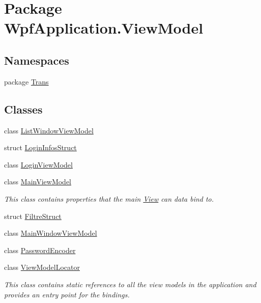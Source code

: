 \hypertarget{namespace_wpf_application_1_1_view_model}{\section{Package Wpf\-Application.\-View\-Model}
\label{namespace_wpf_application_1_1_view_model}
}
\subsection*{Namespaces}
\begin{DoxyCompactItemize}
\item 
package \hyperlink{namespace_wpf_application_1_1_view_model_1_1_trans}{Trans}
\end{DoxyCompactItemize}
\subsection*{Classes}
\begin{DoxyCompactItemize}
\item 
class \hyperlink{class_wpf_application_1_1_view_model_1_1_list_window_view_model}{List\-Window\-View\-Model}
\item 
struct \hyperlink{struct_wpf_application_1_1_view_model_1_1_login_infos_struct}{Login\-Infos\-Struct}
\item 
class \hyperlink{class_wpf_application_1_1_view_model_1_1_login_view_model}{Login\-View\-Model}
\item 
class \hyperlink{class_wpf_application_1_1_view_model_1_1_main_view_model}{Main\-View\-Model}
\begin{DoxyCompactList}\small\item\em This class contains properties that the main \hyperlink{namespace_wpf_application_1_1_view}{View} can data bind to. \end{DoxyCompactList}\item 
struct \hyperlink{struct_wpf_application_1_1_view_model_1_1_filtre_struct}{Filtre\-Struct}
\item 
class \hyperlink{class_wpf_application_1_1_view_model_1_1_main_window_view_model}{Main\-Window\-View\-Model}
\item 
class \hyperlink{class_wpf_application_1_1_view_model_1_1_password_encoder}{Password\-Encoder}
\item 
class \hyperlink{class_wpf_application_1_1_view_model_1_1_view_model_locator}{View\-Model\-Locator}
\begin{DoxyCompactList}\small\item\em This class contains static references to all the view models in the application and provides an entry point for the bindings. \end{DoxyCompactList}\end{DoxyCompactItemize}
